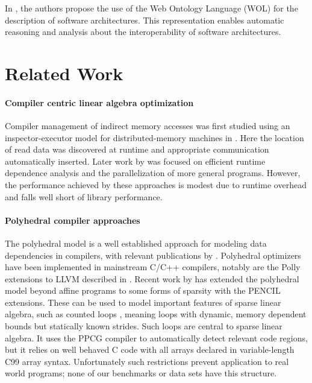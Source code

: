     In \cite{Yuan:2017:TOS:3101282.3101287}, the authors propose the use of the
    Web Ontology Language (WOL) for the description of software architectures.
    This representation enables automatic reasoning and analysis about the
    interoperability of software architectures.



\section{Related Work}
\label{sec:relatedwork}

\paragraph*{Compiler centric linear algebra optimization}
    Compiler management of indirect memory accesses was first studied using an
    inspector-executor model for distributed-memory machines in
    \citet{Baxter:1989:RPS:72935.72967}.
    Here the location of read data was discovered at runtime and appropriate
    communication automatically inserted.
    Later work by \citet{pottenger1995idiom,fisher1994parallelizing,
    rauchwerger1999lrpd,suganuma1996detection} was focused on efficient runtime
    dependence analysis and the parallelization of more general programs.
    However, the performance achieved by these approaches is modest due to
    runtime overhead and falls well short of library performance.

\paragraph*{Polyhedral compiler approaches}
    The polyhedral model is a well established approach for modeling data
    dependencies in compilers, with relevant publications by
    \citet{redon1994scheduling, jouvelot1989unified,
    chi1997optimizing, gupta2006simplifying, stock2014framework}.
    Polyhedral optimizers have been implemented in mainstream C/C++ compilers,
    notably are the Polly extensions to LLVM described in
    \cite{Doerfert2015Polly}.
    Recent work by \citet{7429301} has extended the polyhedral model beyond
    affine programs to some forms of sparsity with the PENCIL extensions.
    These can be used to model important features of sparse linear algebra, such
    as counted loops \citep{Zhao:2018:PCF:3178372.3179509}, meaning loops with
    dynamic, memory dependent bounds but statically known strides.
    Such loops are central to sparse linear algebra.
    It uses the PPCG compiler \citep{Verdoolaege:2013:PPC:2400682.2400713} to
    automatically detect relevant code regions, but it relies on well behaved C
    code with all arrays declared in variable-length C99 array syntax.
    Unfortunately such restrictions prevent application to real world programs;
    none of our benchmarks or data sets have this structure.

